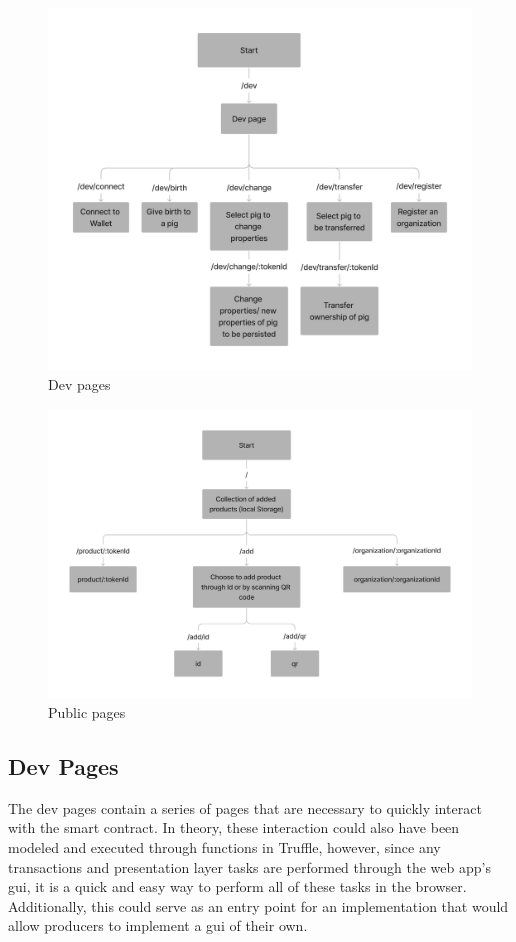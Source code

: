 \documentclass[oneside,a4paper,12pt, colorinlistoftodos]{article} %
\begin{document}
\begin{figure}[pt]
    \centering
    \includegraphics[width=\textwidth]{images/dev_paths.pdf}
    \caption{Dev pages}
    \label{fig:dev_pages}
\end{figure}
\begin{figure}[pt]
    \centering
    \includegraphics[width=\textwidth]{images/public_paths.pdf}
    \caption{Public pages}
    \label{fig:public_pages}
\end{figure}


\subsection{Dev Pages} \label{se:dev_pages}
The dev pages contain a series of pages that are necessary to quickly interact with the smart contract. In theory, these interaction could also have been modeled and executed through functions in Truffle, however, since any transactions and presentation layer tasks are performed through the web app's \gls{gui}, it is a quick and easy way to perform all of these tasks in the browser. Additionally, this could serve as an entry point for an implementation that would allow producers to implement a \gls{gui} of their own.
\end{document}
